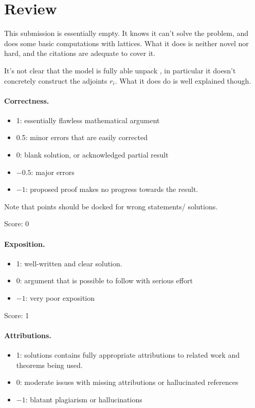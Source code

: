 \documentclass[11pt]{article}
\theoremstyle{remark}
\begin{document}
\maketitle


\section{Review}
This submission is essentially empty. It knows it can't solve the problem, and does some basic computations
with lattices. What it does is neither novel nor hard, and the citations are adequate to cover it.

It's not clear that the model is fully able unpack \cite{GT24}, in particular it
doesn't concretely construct the adjoints $r_i$. What it does do is well explained though.

\paragraph{Correctness.}
\begin{itemize}
	\item  1: essentially flawless mathematical argument
	\item  0.5: minor errors that are easily corrected
	\item  0: blank solution, or acknowledged partial result
	\item  $-0.5$: major errors
	\item  $-1$: proposed proof makes no progress towards the result.
\end{itemize}
Note that points should be docked for wrong statements/ solutions.

\noindent Score: 0

\paragraph{Exposition.}
\begin{itemize}
	\item  1: well-written and clear solution.
	\item  0: argument that is possible to follow with serious effort
	\item  $-1$: very poor exposition
\end{itemize}

\noindent Score: 1

\paragraph{Attributions.}
\begin{itemize}
	\item  1: solutions contains fully appropriate attributions
		to related work and theorems being used.
	\item  0: moderate issues with missing attributions or hallucinated references
	\item  $-1$: blatant plagiarism or hallucinations
\end{itemize}
\end{document}
